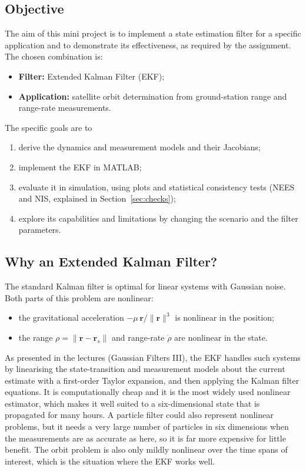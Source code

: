 \documentclass[11pt,a4paper]{article}
\newcommand{\br}{\mathbf{r}}
\begin{document}
\subsection{Objective}
The aim of this mini project is to implement a state estimation filter for a specific application and to demonstrate its effectiveness, as required by the assignment.
The chosen combination is:
\begin{itemize}
  \item \textbf{Filter:} Extended Kalman Filter (EKF);
  \item \textbf{Application:} satellite orbit determination from ground-station range and range-rate measurements.
\end{itemize}
The specific goals are to
\begin{enumerate}
  \item derive the dynamics and measurement models and their Jacobians;
  \item implement the EKF in MATLAB;
  \item evaluate it in simulation, using plots and statistical consistency tests (NEES and NIS, explained in Section~\ref{sec:checks});
  \item explore its capabilities and limitations by changing the scenario and the filter parameters.
\end{enumerate}

\subsection{Why an Extended Kalman Filter?}
The standard Kalman filter is optimal for linear systems with Gaussian noise. Both parts of this problem are nonlinear:
\begin{itemize}
  \item the gravitational acceleration $-\mu\,\br/\|\br\|^3$ is nonlinear in the position;
  \item the range $\rho=\|\br-\br_s\|$ and range-rate $\dot\rho$ are nonlinear in the state.
\end{itemize}
As presented in the lectures (Gaussian Filters III), the EKF handles such systems by linearising the state-transition and measurement models about the current estimate with a first-order Taylor expansion, and then applying the Kalman filter equations.
It is computationally cheap and it is the most widely used nonlinear estimator, which makes it well suited to a six-dimensional state that is propagated for many hours.
A particle filter could also represent nonlinear problems, but it needs a very large number of particles in six dimensions when the measurements are as accurate as here, so it is far more expensive for little benefit.
The orbit problem is also only mildly nonlinear over the time spans of interest, which is the situation where the EKF works well.
\end{document}
